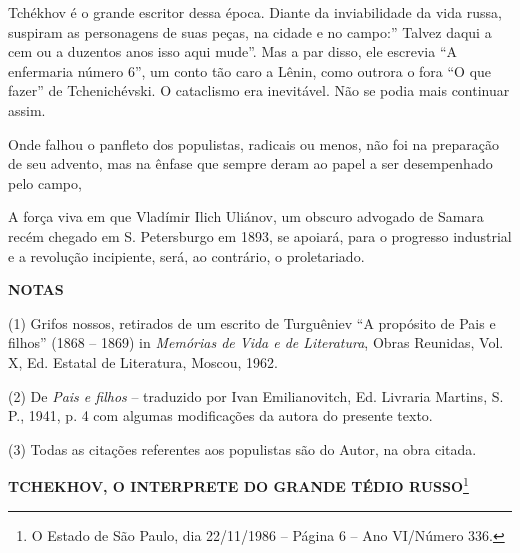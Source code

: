 Tchékhov é o grande escritor dessa época. Diante da inviabilidade da
vida russa, suspiram as personagens de suas peças, na cidade e no
campo:'' Talvez daqui a cem ou a duzentos anos isso aqui mude''. Mas a
par disso, ele escrevia ``A enfermaria número 6'', um conto tão caro a
Lênin, como outrora o fora ``O que fazer'' de Tchenichévski. O
cataclismo era inevitável. Não se podia mais continuar assim.

Onde falhou o panfleto dos populistas, radicais ou menos, não foi na
preparação de seu advento, mas na ênfase que sempre deram ao papel a ser
desempenhado pelo campo,

A força viva em que Vladímir Ilich Uliánov, um obscuro advogado de
Samara recém chegado em S. Petersburgo em 1893, se apoiará, para o
progresso industrial e a revolução incipiente, será, ao contrário, o
proletariado.

\textbf{NOTAS}

(1) Grifos nossos, retirados de um escrito de Turguêniev ``A propósito
de Pais e filhos'' (1868 -- 1869) in \emph{Memórias de Vida e de
Literatura}, Obras Reunidas, Vol. X, Ed. Estatal de Literatura, Moscou,
1962.

(2) De \emph{Pais e filhos} -- traduzido por Ivan Emilianovitch, Ed.
Livraria Martins, S. P., 1941, p. 4 com algumas modificações da autora
do presente texto.

(3) Todas as citações referentes aos populistas são do Autor, na obra
citada.

\textbf{TCHEKHOV, O INTERPRETE DO GRANDE TÉDIO RUSSO}\footnote{O Estado
  de São Paulo, dia 22/11/1986 -- Página 6 -- Ano VI/Número 336.}

